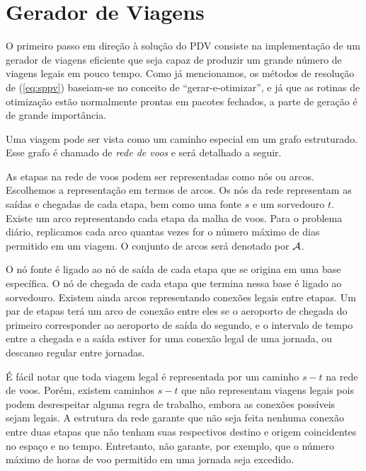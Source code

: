 
\section{Gerador de Viagens}
\label{sec:gerador_viagens}

O primeiro passo em direção à solução do PDV consiste na implementação de um gerador de viagens 
eficiente que seja capaz de produzir um grande número de viagens legais em pouco tempo. Como já
mencionamos, os métodos de resolução de (\ref{eq:sppv}) baseiam-se no conceito de 
``gerar-e-otimizar'', e já que as rotinas de otimização estão normalmente prontas em pacotes 
fechados, a parte de geração é de grande importância.

Uma viagem pode ser vista como um caminho especial em um grafo estruturado. Esse grafo é chamado de
\emph{rede de voos} e será detalhado a seguir. 

As etapas na rede de voos podem ser representadas como nós ou arcos. Escolhemos a representação em
termos de arcos. Os nós da rede representam as saídas e chegadas de cada etapa, bem como uma fonte
$s$ e um sorvedouro $t$. Existe um arco representando cada etapa da malha de voos. Para o problema
diário, replicamos cada arco quantas vezes for o número máximo de dias permitido em um viagem. O
conjunto de arcos será denotado por $\mathcal{A}$.

O nó fonte é ligado ao nó de saída de cada etapa que se origina em uma base específica. O nó de
chegada de cada etapa que termina nessa base é ligado ao sorvedouro. Existem ainda arcos
representando conexões legais entre etapas. Um par de etapas terá um arco de conexão entre eles se
o aeroporto de chegada do primeiro corresponder ao aeroporto de saída do segundo, e o intervalo de
tempo entre a chegada e a saída estiver for uma conexão legal de uma jornada, 
ou descanso regular entre jornadas. 

É fácil notar que toda viagem legal é representada por um caminho $s-t$ na rede de voos. Porém,
existem caminhos $s-t$ que não representam viagens legais pois podem desrespeitar alguma regra de
trabalho, embora as conexões possíveis sejam legais. A estrutura da rede garante que não seja feita
nenhuma conexão entre duas etapas que não tenham suas respectivos destino e origem coincidentes no
espaço e no tempo. Entretanto, não garante, por exemplo, que o número máximo de horas de voo
permitido em uma jornada seja excedido. 

